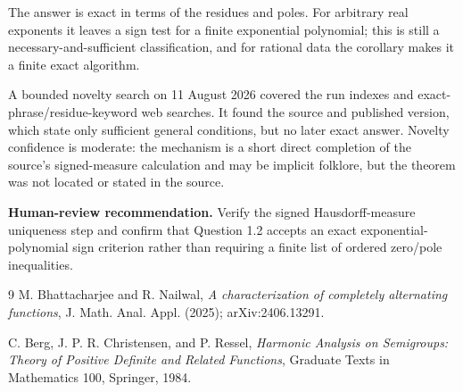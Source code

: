 \documentclass[10pt]{article}
\begin{document}
The answer is exact in terms of the residues and poles.  For arbitrary real
exponents it leaves a sign test for a finite exponential polynomial; this is
still a necessary-and-sufficient classification, and for rational data the
corollary makes it a finite exact algorithm.

A bounded novelty search on 11 August 2026 covered the run indexes and
exact-phrase/residue-keyword web searches.  It found the source and published
version, which state only sufficient general conditions, but no later exact
answer.  Novelty confidence is moderate: the mechanism is a short direct
completion of the source's signed-measure calculation and may be implicit
folklore, but the theorem was not located or stated in the source.

\textbf{Human-review recommendation.} Verify the signed Hausdorff-measure
uniqueness step and confirm that Question 1.2 accepts an exact
exponential-polynomial sign criterion rather than requiring a finite list of
ordered zero/pole inequalities.

\begin{thebibliography}{9}
M. Bhattacharjee and R. Nailwal,
\emph{A characterization of completely alternating functions},
J. Math. Anal. Appl. (2025); arXiv:2406.13291.

C. Berg, J. P. R. Christensen, and P. Ressel,
\emph{Harmonic Analysis on Semigroups: Theory of Positive Definite and Related
Functions}, Graduate Texts in Mathematics 100, Springer, 1984.
\end{thebibliography}
\end{document}
